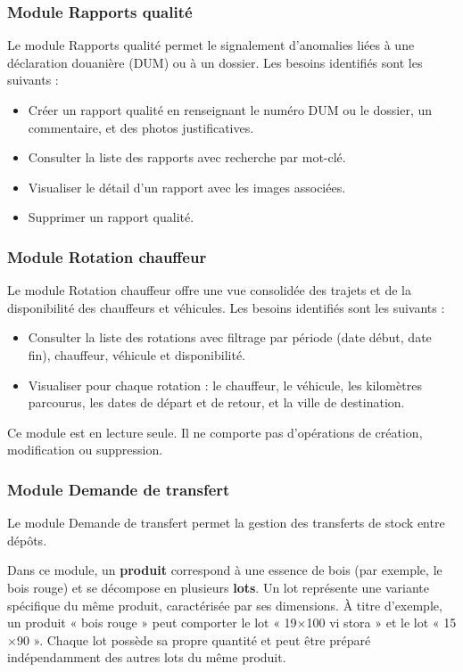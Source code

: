 \documentclass[12pt,a4paper]{article}
\begin{document}
    \subsubsection{Module Rapports qualité}
    Le module Rapports qualité permet le signalement d'anomalies liées à une déclaration douanière (DUM) ou à un dossier. Les besoins identifiés sont les suivants :
    \begin{itemize}[leftmargin=1.2em]
    \item Créer un rapport qualité en renseignant le numéro DUM ou le dossier, un commentaire, et des photos justificatives.
    \item Consulter la liste des rapports avec recherche par mot-clé.
    \item Visualiser le détail d'un rapport avec les images associées.
    \item Supprimer un rapport qualité.
    \end{itemize}

    \subsubsection{Module Rotation chauffeur}
    Le module Rotation chauffeur offre une vue consolidée des trajets et de la disponibilité des chauffeurs et véhicules. Les besoins identifiés sont les suivants :
    \begin{itemize}[leftmargin=1.2em]
    \item Consulter la liste des rotations avec filtrage par période (date début, date fin), chauffeur, véhicule et disponibilité.
    \item Visualiser pour chaque rotation : le chauffeur, le véhicule, les kilomètres parcourus, les dates de départ et de retour, et la ville de destination.
    \end{itemize}
    Ce module est en lecture seule. Il ne comporte pas d'opérations de création, modification ou suppression.

    \subsubsection{Module Demande de transfert}
    Le module Demande de transfert permet la gestion des transferts de stock entre dépôts.

    Dans ce module, un \textbf{produit} correspond à une essence de bois (par exemple, le bois rouge) et se décompose en plusieurs \textbf{lots}. Un lot représente une variante spécifique du même produit, caractérisée par ses dimensions. À titre d'exemple, un produit « bois rouge » peut comporter le lot « 19$\times$100 vi stora » et le lot « 15$\times$90 ». Chaque lot possède sa propre quantité et peut être préparé indépendamment des autres lots du même produit.
\end{document}
